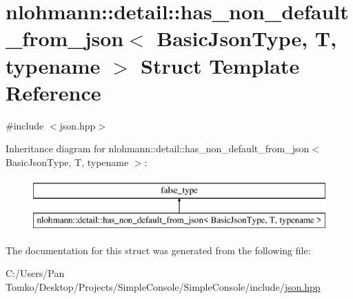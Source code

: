 \hypertarget{structnlohmann_1_1detail_1_1has__non__default__from__json}{}\section{nlohmann\+::detail\+::has\+\_\+non\+\_\+default\+\_\+from\+\_\+json$<$ Basic\+Json\+Type, T, typename $>$ Struct Template Reference}
\label{structnlohmann_1_1detail_1_1has__non__default__from__json}


{\ttfamily \#include $<$json.\+hpp$>$}

Inheritance diagram for nlohmann\+::detail\+::has\+\_\+non\+\_\+default\+\_\+from\+\_\+json$<$ Basic\+Json\+Type, T, typename $>$\+:\begin{figure}[H]
\begin{center}
\leavevmode
\includegraphics[height=2.000000cm]{d7/d08/structnlohmann_1_1detail_1_1has__non__default__from__json}
\end{center}
\end{figure}


The documentation for this struct was generated from the following file\+:\begin{DoxyCompactItemize}
\item 
C\+:/\+Users/\+Pan Tomko/\+Desktop/\+Projects/\+Simple\+Console/\+Simple\+Console/include/\mbox{\hyperlink{json_8hpp}{json.\+hpp}}\end{DoxyCompactItemize}
